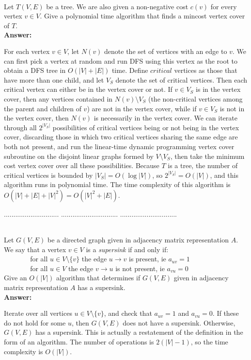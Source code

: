 \documentclass[a4paper,11pt]{article}
\begin{document}
\\
Let $T(V,E)$ be a tree. We are also given a non-negative cost $c(v)$ for every vertex $v\in V$. 
Give a polynomial time algorithm that finds a mincost vertex cover of $T$.\\
{\bf Answer:} \par
For each vertex $v \in V$, let $N(v)$ denote the set of vertices with an edge to $v$. We can first pick a vertex at random and run DFS using this vertex as the root to obtain a DFS tree in $O(|V| + |E|)$ time. Define $\textit{critical}$ vertices as those that have more than one child, and let $V_S$ denote the set of critical vertices. Then each critical vertex can either be in the vertex cover or not. If $v \in V_S$ is in the vertex cover, then any vertices contained in $N(v) \setminus V_S$ (the non-critical vertices among the parent and children of $v$) are not in the vertex cover, while if $v \in V_S$ is not in the vertex cover, then $N(v)$ is necessarily in the vertex cover. We can iterate through all $2^{|V_S|}$ possibilities of critical vertices being or not being in the vertex cover, discarding those in which two critical vertices sharing the same edge are both not present, and run the linear-time dynamic programming vertex cover subroutine on the disjoint linear graphs formed by $V \setminus V_S$, then take the minimum cost vertex cover over all these possibilities. Because $T$ is a tree, the number of critical vertices is bounded by $|V_S| = O(\log |V|)$, so $2^{|V_S|} = O(|V|)$, and this algorithm runs in polynomial time. The time complexity of this algorithm is $O(|V| + |E| + |V|^2) = O(|V|^2 + |E|)$.

\pagebreak

 $.............................$
 $..............................$
          $..............................$\\

\bigskip

\\
Let $G(V,E)$ be a directed graph given in adjacency matrix representation $A$. 
We say that a vertex $v \in V$ is a {\em supersink} if and only if:\\
$~~~~~~~~~~~~~~~~$ for all $u \in V \setminus \{ v \}$ the edge $u \rightarrow v$ is present, ie $a_{uv}=1$\\
$~~~~~~~~~~~~~~~~$ for all $u \in V$ the edge $v \rightarrow u$ is not present, ie $a_{vu}=0$\\
Give an $O(|V|)$ algorithm that determines if $G(V,E)$  given in adjacency matrix representation $A$ has a supersink.\\
{\bf Answer:} \par
Iterate over all vertices $u \in V \setminus \{ v \}$, and check that $a_{uv} = 1$ and $a_{vu} = 0$. If these do not hold for some $u$, then $G(V, E)$ does not have a supersink. Otherwise, $G(V, E)$ has a supersink. This is actually a restatement of the definition in the form of an algorithm. The number of operations is $2(|V| - 1)$, so the time complexity is $O(|V|)$.
\end{document}
